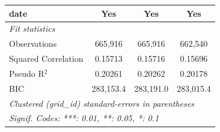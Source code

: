 \begin{tabular}{lccc}
   date                                                              & Yes           & Yes           & Yes\\  
   \midrule
   \emph{Fit statistics}\\
   Observations                                                      & 665,916       & 665,916       & 662,540\\  
   Squared Correlation                                               & 0.15713       & 0.15716       & 0.15696\\  
   Pseudo R$^2$                                                      & 0.20261       & 0.20262       & 0.20178\\  
   BIC                                                               & 283,153.4     & 283,191.0     & 283,015.4\\  
   \midrule \midrule
   \multicolumn{4}{l}{\emph{Clustered (grid\_id) standard-errors in parentheses}}\\
   \multicolumn{4}{l}{\emph{Signif. Codes: ***: 0.01, **: 0.05, *: 0.1}}\\
\end{tabular}
\par\endgroup


